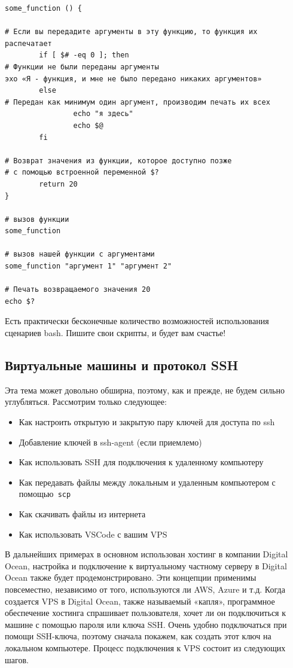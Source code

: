 \documentclass[12pt]{article}
\providecommand{\tightlist}{%
  \setlength{\itemsep}{0pt}\setlength{\parskip}{0pt}}
\begin{document}
\begin{verbatim}
some_function () {

# Если вы передадите аргументы в эту функцию, то функция их распечатает
        if [ $# -eq 0 ]; then
# Функции не были переданы аргументы
эхо «Я - функция, и мне не было передано никаких аргументов»
        else
# Передан как минимум один аргумент, производим печать их всех
                echo "я здесь"
                echo $@
        fi

# Возврат значения из функции, которое доступно позже
# с помощью встроенной переменной $?
        return 20
}

# вызов функции
some_function

# вызов нашей функции с аргументами
some_function "аргумент 1" "аргумент 2"

# Печать возвращаемого значения 20
echo $?
\end{verbatim}

Есть практически бесконечные количество возможностей использования
сценариев bash. Пишите свои скрипты, и будет вам счастье!

\hypertarget{Virtual-Machines-and-SSH-Protocol}{%
\subsection{\texorpdfstring{\protect\hyperlink{Virtual-Machines-and-SSH-Protocol}{}Виртуальные
машины и протокол
SSH}{Виртуальные машины и протокол SSH}}\label{Virtual-Machines-and-SSH-Protocol}}

Эта тема может довольно обширна, поэтому, как и прежде, не будем сильно
углубляться. Рассмотрим только следующее:

\begin{itemize}
\tightlist
\item
  Как настроить открытую и закрытую пару ключей для доступа по ssh
\item
  Добавление ключей в ssh-agent (если приемлемо)
\item
  Как использовать SSH для подключения к удаленному компьютеру
\item
  Как передавать файлы между локальным и удаленным компьютером с
  помощью\texttt{\ scp}
\item
  Как скачивать файлы из интернета
\item
  Как использовать VSCode с вашим VPS
\end{itemize}

В дальнейших примерах в основном использован хостинг в компании Digital
Ocean, настройка и подключение к виртуальному частному серверу в Digital
Ocean также будет продемонстрировано. Эти концепции применимы
повсеместно, независимо от того, используются ли AWS, Azure и т.д. Когда
создается VPS в Digital Ocean, также называемый «капля», программное
обеспечение хостинга спрашивает пользователя, хочет ли он подключиться к
машине с помощью пароля или ключа SSH. Очень удобно подключаться при
помощи SSH-ключа, поэтому сначала покажем, как создать этот ключ на
локальном компьютере. Процесс подключения к VPS состоит из следующих
шагов.
\end{document}
